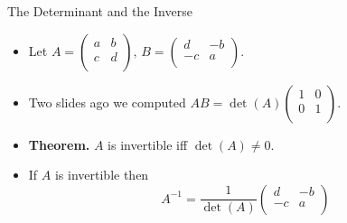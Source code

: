 \documentclass{beamer}
\begin{document}
\begin{frame}{The Determinant and the Inverse}

\begin{itemize}
\item Let
$A=
\begin{pmatrix}
a & b  \\
c & d  \\
\end{pmatrix}
\text{, }
B=
\begin{pmatrix}
d & -b  \\
-c & a  \\
\end{pmatrix}.
$
\item Two slides ago we computed
$AB = \det(A)
\begin{pmatrix}
1 & 0  \\
0 & 1  \\
\end{pmatrix}
$.
\item \textbf{Theorem.} $A$ is invertible iff $\det(A)\not=0$.
\item If $A$ is invertible then
$$A^{-1} = \frac{1}{\det(A)}
\begin{pmatrix}
d & -b  \\
-c & a  \\
\end{pmatrix}
$$
\end{itemize}
\end{frame}


\end{document}
